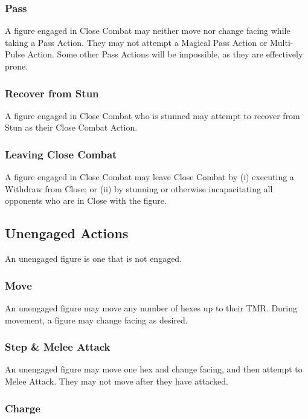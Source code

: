 \begin{multicols*}{3}
\subsubsection{Pass}

A figure engaged in Close Combat may neither move nor change facing
while taking a Pass Action. They may not attempt a Magical Pass Action
or Multi-Pulse Action. Some other Pass Actions will be impossible, as
they are effectively prone.

\subsubsection{Recover from Stun}

A figure engaged in Close Combat who is stunned may attempt to recover
from Stun as their Close Combat Action.

\subsubsection{Leaving Close Combat}

A figure engaged in Close Combat may leave Close Combat by (i)
executing a Withdraw from Close; or (ii) by stunning or otherwise
incapacitating all opponents who are in Close with the figure.

\subsection{Unengaged Actions}
\label{combat:unengaged}

An unengaged figure is one that is not engaged.

\subsubsection{Move}

An unengaged figure may move any number of hexes up to their
TMR. During movement, a figure may change facing as desired.

\subsubsection{Step \& Melee Attack}

An unengaged figure may move one hex and change facing, and then
attempt to Melee Attack. They may not move after they have attacked.

\subsubsection{Charge}


\end{multicols*}
